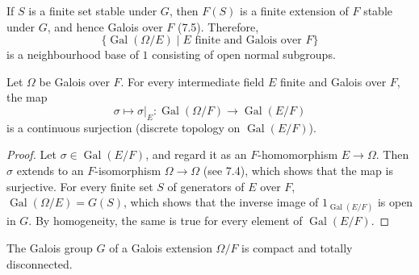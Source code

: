 If $S$ is a finite set stable under $G$, then $F(S)$ is a finite extension of $F$ stable under $G$, and hence Galois over $F$ (7.5). Therefore,
\[
\{\operatorname{Gal}(\Omega/E)\mid E\text{ finite and Galois over }F\}
\]
is a neighbourhood base of $1$ consisting of open normal subgroups.
\begin{proposition}[7.7]
Let $\Omega$ be Galois over $F$. For every intermediate field $E$ finite and Galois over $F$, the map
\[
\sigma\longmapsto\sigma|_E:\operatorname{Gal}(\Omega/F)\longrightarrow\operatorname{Gal}(E/F)
\]
is a continuous surjection (discrete topology on $\operatorname{Gal}(E/F)$).
\end{proposition}
\begin{proof}
Let $\sigma\in\operatorname{Gal}(E/F)$, and regard it as an $F$-homomorphism $E\to\Omega$. Then $\sigma$ extends to an $F$-isomorphism $\Omega\to\Omega$ (see 7.4), which shows that the map is surjective. For every finite set $S$ of generators of $E$ over $F$, $\operatorname{Gal}(\Omega/E)=G(S)$, which shows that the inverse image of $1_{\operatorname{Gal}(E/F)}$ is open in $G$. By homogeneity, the same is true for every element of $\operatorname{Gal}(E/F)$.
\end{proof}
\begin{proposition}[7.8]
The Galois group $G$ of a Galois extension $\Omega/F$ is compact and totally disconnected.
\end{proposition}
